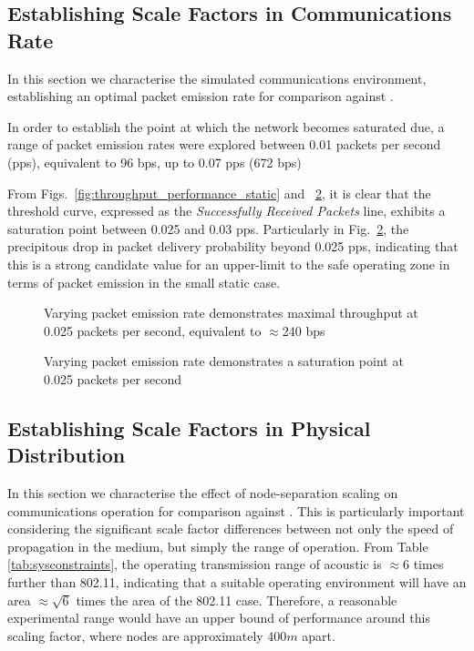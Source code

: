 \subsection{Establishing Scale Factors in Communications Rate}

In this section we characterise the simulated communications environment, establishing an optimal packet emission rate for comparison against \cite{Guo11}.

In order to establish the point at which the network becomes saturated due, a range of packet emission rates were explored between 0.01 packets per second (pps), equivalent to 96 bps, up to 0.07 pps (672 bps)

From Figs.~\ref{fig:throughput_performance_static} and ~\ref{fig:prod_breakdown_static}, it is clear that the threshold curve, expressed as the \emph{Successfully Received Packets} line, exhibits a saturation point between 0.025 and 0.03 pps.
Particularly in Fig.~\ref{fig:prod_breakdown_static}, the precipitous drop in packet delivery probability beyond 0.025 pps, indicating that this is a strong candidate value for an upper-limit to the safe operating zone in terms of packet emission in the small static case.

\begin{figure}[H]
	\centering
	\caption{Varying packet emission rate demonstrates maximal throughput at 0.025 packets per second, equivalent to $\approx$240 bps}
	\label{fig:3d}
\end{figure}


\begin{figure}[H]
	\centering
	\caption{Varying packet emission rate demonstrates a saturation point at 0.025 packets per second}
	\label{fig:prod_breakdown_static}
\end{figure}



\subsection{Establishing Scale Factors in Physical Distribution}

In this section we characterise the effect of node-separation scaling on communications operation for comparison against \cite{Guo11}. This is particularly important considering the significant scale factor differences between not only the speed of propagation in the medium, but simply the range of operation. 
From Table \ref{tab:sysconstraints}, the operating transmission range of acoustic is $\approx 6$ times further than 802.11, indicating that a suitable operating environment will have an area $\approx \sqrt{6}$ times the area of the 802.11 case. Therefore, a reasonable experimental range would have an upper bound of performance around this scaling factor, where nodes are approximately 400$m$ apart. 

